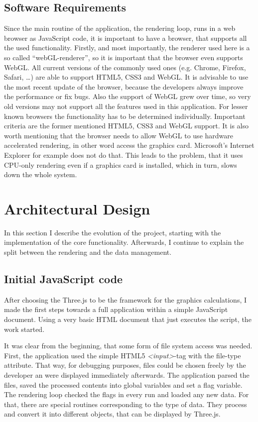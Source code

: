 \subsection{Software Requirements} \label{SoftReq}
Since the main routine of the application, the rendering loop, runs in a web browser as JavaScript code, it is important to have a browser, that supports all the used functionality. Firstly, and most importantly, the renderer used here is a so called ``webGL-renderer'', so it is important that the browser even supports WebGL. All current versions of the commonly used ones (e.g. Chrome, Firefox, Safari, \ldots) are able to support HTML5, CSS3 and WebGL. It is advisable to use the most recent update of the browser, because the developers always improve the performance or fix bugs. Also the support of WebGL grew over time, so very old versions may not support all the features used in this application. For lesser known browsers the functionality has to be determined individually. Important criteria are the former mentioned HTML5, CSS3 and WebGL support. It is also worth mentioning that the browser needs to allow WebGL to use hardware accelerated rendering, in other word access the graphics card. Microsoft's Internet Explorer for example does not do that. This leads to the problem, that it uses CPU-only rendering even if a graphics card is installed, which in turn, slows down the whole system.
\section{Architectural Design}
In this section I describe the evolution of the project, starting with the implementation of the core functionality. Afterwards, I continue to explain the split between the rendering and the data management.
\subsection{Initial JavaScript code}
After choosing the Three.js to be the framework for the graphics calculations, I made the first steps towards a full application within a simple JavaScript document. Using a very basic HTML document that just executes the script, the work started.

It was clear from the beginning, that some form of file system access was needed. First, the application used the simple HTML5 \emph{<input>}-tag with the file-type attribute. That way, for debugging purposes, files could be chosen freely by the developer an were displayed immediately afterwards. The application parsed the files, saved the processed contents into global variables and set a flag variable. The rendering loop checked the flags in every run and loaded any new data. For that, there are special routines corresponding to the type of data. They process and convert it into different objects, that can be displayed by Three.js.

